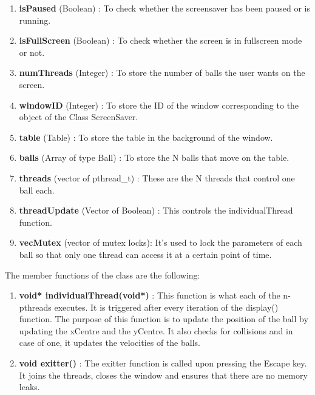 \documentclass[]{article}
\begin{document}
\begin{itemize}
\begin{flushleft}
\begin{enumerate}
\item \textbf{isPaused} (Boolean) : To check whether the screensaver has been paused or is running.

\item \textbf{isFullScreen} (Boolean) : To check whether the screen is in fullscreen mode or not.

\item \textbf{numThreads} (Integer) : To store the number of balls the user wants on the screen.

\item \textbf{windowID} (Integer) : To store the ID of the window corresponding to the object of the Class ScreenSaver.

\item \textbf{table} (Table) : To store the table in the background of the window.

\item \textbf{balls} (Array of type Ball) : To store the N balls that move on the table.

\item \textbf{threads} (vector of pthread\_t) : These are the N threads that control one ball each.

\item \textbf{threadUpdate} (Vector of Boolean) : This controls the individualThread function.

\item \textbf{vecMutex} (vector of mutex locks): It's used to lock the parameters of each ball so that only one thread can access it at a certain point of time. 

\end{enumerate}


The member functions of the class are the following:

\begin{enumerate}

\item \textbf{ void* individualThread(void*)} : This function is what each of the n-pthreads executes. It is triggered after every iteration of the display() function. The purpose of this function is to update the position of the ball by updating the xCentre and the yCentre. It also checks for collisions and in case of one, it updates the velocities of the balls. 

\item \textbf{void exitter()} : The exitter function is called upon pressing the Escape key. It joins the threads, closes the window and ensures that there are no memory leaks.


\end{enumerate}
\end{flushleft}
\end{itemize}
\end{document}
